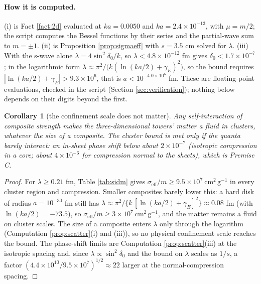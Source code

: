 \documentclass[11pt]{article}
\newtheorem{corollary}[theorem]{Corollary}
\theoremstyle{definition}
\newcommand{\cmg}{\mathrm{cm^{2}\,g^{-1}}}
\begin{document}
\paragraph{How it is computed.} (i) is Fact \ref{fact:2d} evaluated at $ka = 0.0050$ and $ka = 2.4 \times 10^{-13}$, with $\mu = m/2$; the script computes the Bessel functions by their series and the partial-wave sum to $m = \pm 1$. (ii) is Proposition \ref{prop:sigmaeff} with $s = 3.5$ cm solved for $\lambda$. (iii) With the s-wave alone $\lambda = 4\sin^{2}\delta_{0}/k$, so $\lambda < 4.8 \times 10^{-12}$ fm gives $\delta_{0} < 1.7 \times 10^{-7}$; in the logarithmic form $\lambda \approx \pi^{2}/\bigl(k(\ln(ka/2) + \gamma_{E})^{2}\bigr)$, so the bound requires $|\ln(ka/2) + \gamma_{E}| > 9.3 \times 10^{6}$, that is $a < 10^{-4.0 \times 10^{6}}$ fm. These are floating-point evaluations, checked in the script (Section \ref{sec:verification}); nothing below depends on their digits beyond the first.

\begin{corollary}[the confinement scale does not matter]\label{cor:confinement}
Any self-interaction of composite strength makes the three-dimensional towers' matter a fluid in clusters, whatever the size of a composite. The cluster bound is met only if the quanta barely interact: an in-sheet phase shift below about $2 \times 10^{-7}$ (isotropic compression in a core; about $4 \times 10^{-6}$ for compression normal to the sheets), which is Premise C.
\end{corollary}

\begin{proof}
For $\lambda \ge 0.21$ fm, Table \ref{tab:sidm} gives $\sigma_{\mathrm{eff}}/m \ge 9.5 \times 10^{7}\ \cmg$ in every cluster region and compression. Smaller composites barely lower this: a hard disk of radius $a = 10^{-30}$ fm still has $\lambda \approx \pi^{2}/\{k\,[\ln(ka/2) + \gamma_{E}]^{2}\} \approx 0.08$ fm (with $\ln(ka/2) = -73.5$), so $\sigma_{\mathrm{eff}}/m \ge 3 \times 10^{7}\ \cmg$, and the matter remains a fluid on cluster scales. The size of a composite enters $\lambda$ only through the logarithm (Computation \ref{prop:scatter}(i) and (iii)), so no physical confinement scale reaches the bound. The phase-shift limits are Computation \ref{prop:scatter}(iii) at the isotropic spacing and, since $\lambda \propto \sin^{2}\delta_{0}$ and the bound on $\lambda$ scales as $1/s$, a factor $(4.4 \times 10^{10}/9.5 \times 10^{7})^{1/2} \approx 22$ larger at the normal-compression spacing.
\end{proof}
\end{document}
